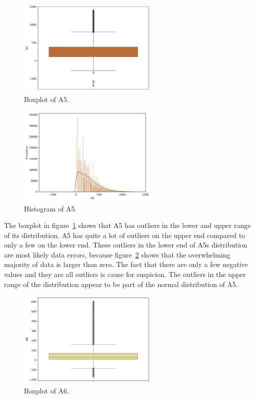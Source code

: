 \documentclass[11pt]{report}
\begin{document}
\begin{figure}[H]
    \centering
    \includegraphics[width=0.6\textwidth]{images/A5_boxplot.pdf}
    \caption{Boxplot of A5.}
    \label{fig:a5_boxplot}
\end{figure}


\begin{figure}[H]
    \centering
    \includegraphics[width=0.6\textwidth]{images/A5_histplot.pdf}
    \caption{Histogram of A5.}
    \label{fig:a5_histplot}
\end{figure}

The boxplot in figure~\ref{fig:a5_boxplot} shows that A5 has outliers in the lower and upper range of its distribution. A5 has quite a lot of outliers on the upper end compared to only a few on the lower end. These outliers in the lower end of A5s distribution are most likely data errors, because figure~\ref{fig:a5_histplot} shows that the overwhelming majority of data is larger than zero. The fact that there are only a few negative values and they are all outliers is cause for suspicion. The outliers in the upper range of the distribution appear to be part of the normal distribution of A5.

\begin{figure}[H]
    \centering
    \includegraphics[width=0.6\textwidth]{images/A6_boxplot.pdf}
    \caption{Boxplot of A6.}
    \label{fig:a6_boxplot}
\end{figure}
\end{document}

